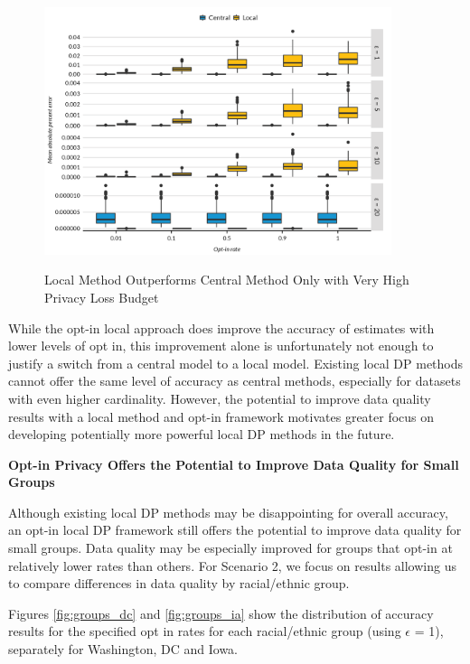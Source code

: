 \documentclass[
]{urban-formatting}
\begin{document}
\begin{figure}[!htb]
    \centering
    \caption{Local Method Outperforms Central Method Only with Very High Privacy Loss Budget}
    \includegraphics[width=4in]{../figures/methods_accuracy.png}
    \label{fig:methods-accuracy}
\end{figure}

While the opt-in local approach does improve the accuracy of estimates
with lower levels of opt in, this improvement alone is unfortunately not
enough to justify a switch from a central model to a local model.
Existing local DP methods cannot offer the same level of accuracy as
central methods, especially for datasets with even higher cardinality.
However, the potential to improve data quality results with a local
method and opt-in framework motivates greater focus on developing
potentially more powerful local DP methods in the future.

\textbf{Opt-in Privacy Offers the Potential to Improve Data Quality for
Small Groups}

Although existing local DP methods may be disappointing for overall
accuracy, an opt-in local DP framework still offers the potential to
improve data quality for small groups. Data quality may be especially
improved for groups that opt-in at relatively lower rates than others.
For Scenario 2, we focus on results allowing us to compare differences
in data quality by racial/ethnic group.

Figures \ref{fig:groups_dc} and \ref{fig:groups_ia} show the
distribution of accuracy results for the specified opt in rates for each
racial/ethnic group (using \(\epsilon\) = 1), separately for Washington,
DC and Iowa.
\end{document}
